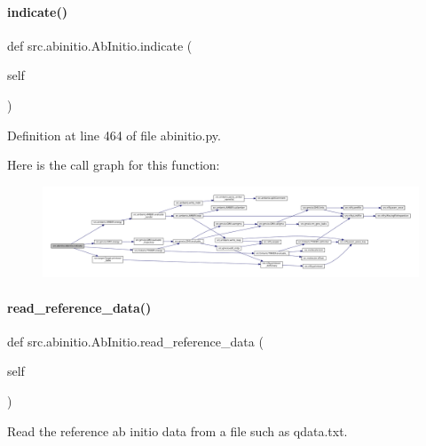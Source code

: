 \paragraph{\texorpdfstring{indicate()}{indicate()}}
{\footnotesize\ttfamily def src.\+abinitio.\+Ab\+Initio.\+indicate (\begin{DoxyParamCaption}\item[{}]{self }\end{DoxyParamCaption})}



Definition at line 464 of file abinitio.\+py.

Here is the call graph for this function\+:
\nopagebreak
\begin{figure}[H]
\begin{center}
\leavevmode
\includegraphics[width=350pt]{classsrc_1_1abinitio_1_1AbInitio_ac1ecf4fd0ddfbd22d9baee6629ed1e27_cgraph}
\end{center}
\end{figure}
\mbox{\label{classsrc_1_1abinitio_1_1AbInitio_afacfa5d84fb6638dcfad3bff7f14d48f}} 
\paragraph{\texorpdfstring{read\+\_\+reference\+\_\+data()}{read\_reference\_data()}}
{\footnotesize\ttfamily def src.\+abinitio.\+Ab\+Initio.\+read\+\_\+reference\+\_\+data (\begin{DoxyParamCaption}\item[{}]{self }\end{DoxyParamCaption})}



Read the reference ab initio data from a file such as qdata.\+txt. 

